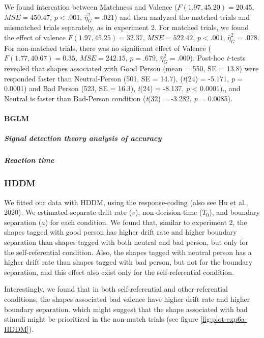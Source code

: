 \documentclass[
  english,
  man]{apa6}
\let\oldparagraph\paragraph
\renewcommand{\paragraph}[1]{\oldparagraph{#1}\mbox{}}
\let\oldsubparagraph\subparagraph
\renewcommand{\subparagraph}[1]{\oldsubparagraph{#1}\mbox{}}
\begin{document}
We found intercation between Matchness and Valence (\(F(1.97, 45.20) = 20.45\), \(\mathit{MSE} = 450.47\), \(p < .001\), \(\hat{\eta}^2_G = .021\)) and then analyzed the matched trials and mismatched trials separately, as in experiment 2. For matched trials, we found the effect of valence \(F(1.97, 45.25) = 32.37\), \(\mathit{MSE} = 522.42\), \(p < .001\), \(\hat{\eta}^2_G = .078\). For non-matched trials, there was no significant effect of Valence (\(F(1.77, 40.67) = 0.35\), \(\mathit{MSE} = 242.15\), \(p = .679\), \(\hat{\eta}^2_G = .000\)). Post-hoc \emph{t}-tests revealed that shapes associated with Good Person (mean = 550, SE = 13.8) were responded faster than Neutral-Person (501, SE = 14.7), (\emph{t}(24) = -5.171, \emph{p} = 0.0001) and Bad Person (523, SE = 16.3), \emph{t}(24) = -8.137, \emph{p} \textless{} 0.0001)., and Neutral is faster than Bad-Person condition (\emph{t}(32) = -3.282, \emph{p} = 0.0085).

\hypertarget{bglm-1}{%
\paragraph{BGLM}\label{bglm-1}}

\hypertarget{signal-detection-theory-analysis-of-accuracy-3}{%
\subparagraph{Signal detection theory analysis of accuracy}\label{signal-detection-theory-analysis-of-accuracy-3}}

\hypertarget{reaction-time-3}{%
\subparagraph{Reaction time}\label{reaction-time-3}}

\hypertarget{hddm-4}{%
\subsubsection{HDDM}\label{hddm-4}}

We fitted our data with HDDM, using the response-coding (also see Hu et al., 2020). We estimated separate drift rate (\(v\)), non-decision time (\(T_{0}\)), and boundary separation (\(a\)) for each condition. We found that, similar to experiment 2, the shapes tagged with good person has higher drift rate and higher boundary separation than shapes tagged with both neutral and bad person, but only for the self-referential condition. Also, the shapes tagged with neutral person has a higher drift rate than shapes tagged with bad person, but not for the boundary separation, and this effect also exist only for the self-referential condition.

Interestingly, we found that in both self-referential and other-referential conditions, the shapes associated bad valence have higher drift rate and higher boundary separation. which might suggest that the shape associated with bad stimuli might be prioritized in the non-match trials (see figure \ref{fig:plot-exp6a-HDDM}).
\end{document}
